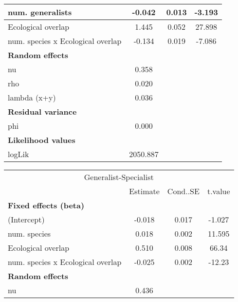 \begin{table}
\begin{table}
\begin{tabular}[t]{l|c|c|c}
\hline
\hspace{1em}num. generalists & -0.042 & 0.013 & -3.193\\
\hline
\hspace{1em}Ecological overlap & 1.445 & 0.052 & 27.898\\
\hline
\hspace{1em}num. species x Ecological overlap & -0.134 & 0.019 & -7.086\\
\hline
\multicolumn{4}{l}{\textbf{Random effects}}\\
\hline
\hspace{1em}nu & 0.358 &  & \\
\hline
\hspace{1em}rho & 0.020 &  & \\
\hline
\hspace{1em}lambda (x+y) & 0.036 &  & \\
\hline
\multicolumn{4}{l}{\textbf{Residual variance}}\\
\hline
\hspace{1em}phi & 0.000 &  & \\
\hline
\multicolumn{4}{l}{\textbf{Likelihood values}}\\
\hline
\hspace{1em}logLik & 2050.887 &  & \\
\hline
\end{tabular}
\end{table}\begin{table}
\centering\centering
\begin{tabular}[t]{l|c|c|c}
\hline
\multicolumn{4}{c}{Generalist-Specialist} \\
\cline{1-4}
  & Estimate & Cond..SE & t.value\\
\hline
\multicolumn{4}{l}{\textbf{Fixed effects (beta)}}\\
\hline
\hspace{1em}(Intercept) & -0.018 & 0.017 & -1.027\\
\hline
\hspace{1em}num. species & 0.018 & 0.002 & 11.595\\
\hline
\hspace{1em}Ecological overlap & 0.510 & 0.008 & 66.34\\
\hline
\hspace{1em}num. species x Ecological overlap & -0.025 & 0.002 & -12.23\\
\hline
\multicolumn{4}{l}{\textbf{Random effects}}\\
\hline
\hspace{1em}nu & 0.436 &  & \\

\end{tabular}
\end{table}
\end{table}
